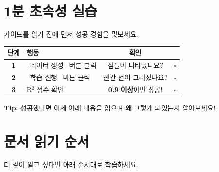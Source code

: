 \documentclass[11pt, a4paper]{article}
\begin{document}
\section{ 1분 초속성 실습}

\begin{successbox}[지금 바로 해보세요!]
가이드를 읽기 전에 먼저 성공 경험을 맛보세요.
\end{successbox}

\vspace{0.5cm}

\begin{center}
\begin{tabular}{clcc}
    \toprule
    \textbf{단계} & \textbf{행동} & \textbf{확인} & \\
    \midrule
    \textbf{1} & \colorbox{mainblue}{\color{white}\small\ 데이터 생성\ } 버튼 클릭 & 점들이 나타났나요? & $\square$ \\[3pt]
    \textbf{2} & \colorbox{applegreen}{\color{white}\small\ 학습 실행\ } 버튼 클릭 & 빨간 선이 그려졌나요? & $\square$ \\[3pt]
    \textbf{3} & R$^2$ 점수 확인 & \textbf{0.9 이상}이면 성공! & $\square$ \\
    \bottomrule
\end{tabular}
\end{center}

\vspace{0.5cm}

\begin{tipbox}
\textbf{Tip:} 성공했다면 이제 아래 내용을 읽으며 \textbf{왜} 그렇게 되었는지 알아보세요!
\end{tipbox}

\section{ 문서 읽기 순서}

더 깊이 알고 싶다면 아래 순서대로 학습하세요.

\vspace{0.3cm}
\end{document}
